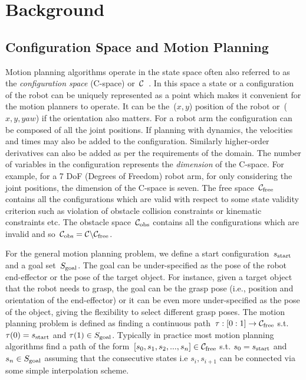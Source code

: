 \documentclass[a4paper]{report}
\begin{document}
\newpage
\chapter{Background}
\section{Configuration Space and Motion Planning}
Motion planning algorithms operate in the state space often also referred to as the \emph{configuration space} (C-space) or~$\mathcal{C}$~\cite{lozano1990spatial}. In this space a state or a configuration of the robot can be uniquely represented as a point which makes it convenient for the motion planners to operate. It can be the~($x,y$) position of the robot or~($x,y,yaw$) if the orientation also matters. For a robot arm the configuration can be composed of all the joint positions. If planning with dynamics, the velocities and times may also be added to the configuration. Similarly higher-order derivatives can also be added as per the requirements of the domain. The number of variables in the configuration represents the \emph{dimension} of the C-space. For example, for a 7 DoF (Degrees of Freedom) robot arm, for only considering the joint positions, the dimension of the C-space is seven. The free space~$\mathcal{C}_{\rm free}$ contains all the configurations which are valid with respect to some state validity criterion such as violation of obstacle collision constraints or kinematic constraints etc. The obstacle space~$\mathcal{C}_{\rm obs}$ contains all the configurations which are invalid and so~$\mathcal{C}_{\rm obs} = \mathcal{C} \backslash \mathcal{C}_{\rm free}$.

For the general motion planning problem, we define a start configuration~$s_{\textrm{start}}$ and a goal set~$S_{\rm goal}$. The goal can be under-specified as the pose of the robot end-effector or the pose of the target object. For instance, given a target object that the robot needs to grasp, the goal can be the grasp pose (i.e., position and orientation of the end-effector) or it can be even more under-specified as the pose of the object, giving the flexibility to select different grasp poses. The motion planning problem is defined as finding a continuous path~$\tau : [0:1] \rightarrow \mathcal{C}_{\rm free}$ s.t. $\tau(0) = s_{\textrm{start}}$ and $\tau(1) \in S_{\rm goal} $. Typically in practice most motion planning algorithms find a path of the form~$[s_0, s_1, s_2,...,s_n] \in \mathcal{C}_{\rm free}$ s.t. $s_0 = s_{\textrm{start}}$ and $s_n \in S_{\rm goal}$ assuming that the consecutive states i.e $s_i, s_{i+1}$ can be connected via some simple interpolation scheme.
\end{document}

